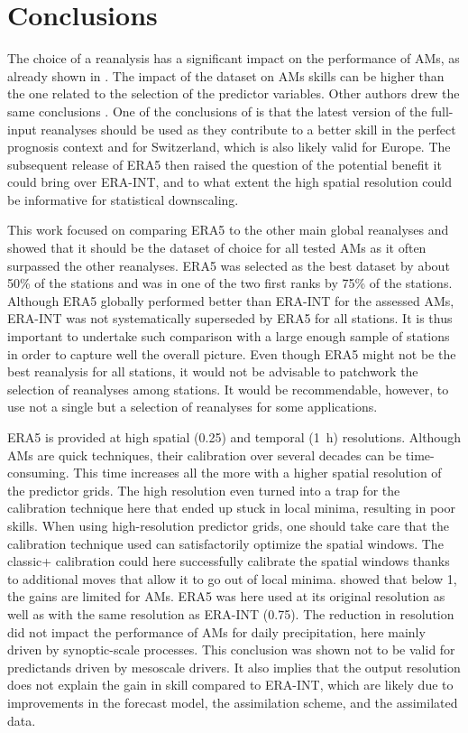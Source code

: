 \documentclass[alpha-refs]{wiley-article}
\begin{document}
\section{Conclusions}
\label{sec:conclusion}

The choice of a reanalysis has a significant impact on the performance of AMs, as already shown in \citet{Horton2018b}. The impact of the dataset on AMs skills can be higher than the one related to the selection of the predictor variables. Other authors drew the same conclusions \cite{Dayon2015}. One of the conclusions of \citet{Horton2018b} is that the latest version of the full-input reanalyses should be used as they contribute to a better skill in the perfect prognosis context and for Switzerland, which is also likely valid for Europe. The subsequent release of ERA5 then raised the question of the potential benefit it could bring over ERA-INT, and to what extent the high spatial resolution could be informative for statistical downscaling.

This work focused on comparing ERA5 to the other main global reanalyses and showed that it should be the dataset of choice for all tested AMs as it often surpassed the other reanalyses. ERA5 was selected as the best dataset by about 50\% of the stations and was in one of the two first ranks by 75\% of the stations. Although ERA5 globally performed better than ERA-INT for the assessed AMs, ERA-INT was not systematically superseded by ERA5 for all stations. It is thus important to undertake such comparison with a large enough sample of stations in order to capture well the overall picture. Even though ERA5 might not be the best reanalysis for all stations, it would not be advisable to patchwork the selection of reanalyses among stations. It would be recommendable, however, to use not a single but a selection of reanalyses for some applications.

ERA5 is provided at high spatial (0.25\degree) and temporal (1~h) resolutions. Although AMs are quick techniques, their calibration over several decades can be time-consuming. This time increases all the more with a higher spatial resolution of the predictor grids. The high resolution even turned into a trap for the calibration technique here that ended up stuck in local minima, resulting in poor skills. When using high-resolution predictor grids, one should take care that the calibration technique used can satisfactorily optimize the spatial windows. The classic+ calibration \citep{Horton2019} could here successfully calibrate the spatial windows thanks to additional moves that allow it to go out of local minima. \citet{Horton2018b} showed that below 1\degree, the gains are limited for AMs. ERA5 was here used at its original resolution as well as with the same resolution as ERA-INT (0.75\degree). The reduction in resolution did not impact the performance of AMs for daily precipitation, here mainly driven by synoptic-scale processes. This conclusion was shown not to be valid for predictands driven by mesoscale drivers. It also implies that the output resolution does not explain the gain in skill compared to ERA-INT, which are likely due to improvements in the forecast model, the assimilation scheme, and the assimilated data.
\end{document}
